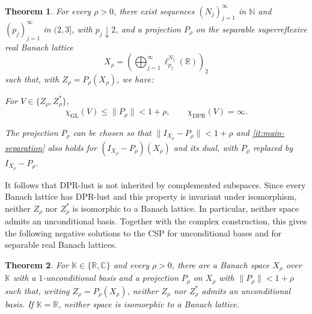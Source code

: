 \documentclass[11pt,a4paper,reqno]{amsart}
\newtheorem{maintheorem}{Theorem}
\theoremstyle{definition}
\newcommand{\N}{\mathbb N}
\newcommand{\R}{\mathbb R}
\newcommand{\C}{\mathbb C}
\newcommand{\norm}[1]{\lVert #1\rVert}
\numberwithin{equation}{section}
\begin{document}
\begin{samepage}
\begin{maintheorem}\label{thm:real-consequences}
For every $\rho>0$, there exist sequences $(N_j)_{j=1}^{\infty}$ in $\N$ and $(p_j)_{j=1}^{\infty}$ in $(2,3]$, with $p_j\downarrow2$, and a projection $P_\rho$ on the separable superreflexive real Banach lattice
\begin{equation*}
 X_\rho=\left(\bigoplus_{j=1}^{\infty}\ell_{p_j}^{N_j}(\R)\right)_2
\end{equation*}
such that, with $Z_\rho=P_\rho(X_\rho)$, we have:
\begin{resultparts}
\item\label{it:main-separation}
For $V\in\{Z_\rho,Z_\rho^*\}$,
\begin{equation*}
 \chi_{\mathrm{GL}}(V)\leq\norm{P_\rho}<1+\rho,
 \qquad \chi_{\mathrm{DPR}}(V)=\infty.
\end{equation*}
\item\label{it:main-complement}
The projection $P_\rho$ can be chosen so that $\norm{I_{X_\rho}-P_\rho}<1+\rho$ and \ref{it:main-separation} also holds for $(I_{X_\rho}-P_\rho)(X_\rho)$ and its dual, with $P_\rho$ replaced by $I_{X_\rho}-P_\rho$.
\end{resultparts}
\end{maintheorem}
\end{samepage}

It follows that DPR-lust is not inherited by complemented subspaces. Since every Banach lattice has DPR-lust and this property is invariant under isomorphism, neither $Z_\rho$ nor $Z_\rho^*$ is isomorphic to a Banach lattice. In particular, neither space admits an unconditional basis. Together with the complex construction, this gives the following negative solutions to the CSP for unconditional bases and for separable real Banach lattices.

\begin{samepage}
\begin{maintheorem}\label{thm:main}
For $\mathbb K\in\{\R,\C\}$ and every $\rho>0$, there are a Banach space $X_\rho$ over $\mathbb K$ with a $1$-unconditional basis and a projection $P_\rho$ on $X_\rho$ with $\norm{P_\rho}<1+\rho$ such that, writing $Z_\rho=P_\rho(X_\rho)$, neither $Z_\rho$ nor $Z_\rho^*$ admits an unconditional basis. If $\mathbb K=\R$, neither space is isomorphic to a Banach lattice.
\end{maintheorem}
\end{samepage}
\end{document}
